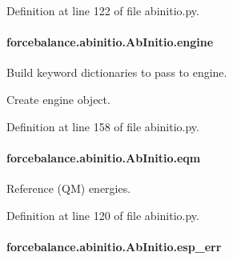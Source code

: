 Definition at line 122 of file abinitio.\-py.

\hypertarget{classforcebalance_1_1abinitio_1_1AbInitio_a34058fdf49b7b3b8f1fea78dd30f3209}{
\paragraph[{engine}]{\setlength{\rightskip}{0pt plus 5cm}forcebalance.\-abinitio.\-Ab\-Initio.\-engine}}\label{classforcebalance_1_1abinitio_1_1AbInitio_a34058fdf49b7b3b8f1fea78dd30f3209}


Build keyword dictionaries to pass to engine. 

Create engine object. 

Definition at line 158 of file abinitio.\-py.

\hypertarget{classforcebalance_1_1abinitio_1_1AbInitio_a64387fae9bdfb0d03ca6961e67c779be}{
\paragraph[{eqm}]{\setlength{\rightskip}{0pt plus 5cm}forcebalance.\-abinitio.\-Ab\-Initio.\-eqm}}\label{classforcebalance_1_1abinitio_1_1AbInitio_a64387fae9bdfb0d03ca6961e67c779be}


Reference (Q\-M) energies. 



Definition at line 120 of file abinitio.\-py.

\hypertarget{classforcebalance_1_1abinitio_1_1AbInitio_abdc625c3149cee375b56b4e0d73034fe}{
\paragraph[{esp\-\_\-err}]{\setlength{\rightskip}{0pt plus 5cm}forcebalance.\-abinitio.\-Ab\-Initio.\-esp\-\_\-err}}\label{classforcebalance_1_1abinitio_1_1AbInitio_abdc625c3149cee375b56b4e0d73034fe}


